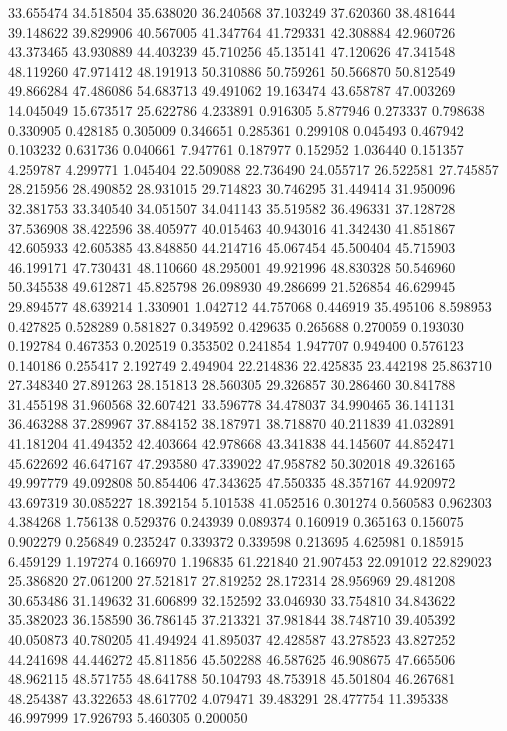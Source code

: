 33.655474
34.518504
35.638020
36.240568
37.103249
37.620360
38.481644
39.148622
39.829906
40.567005
41.347764
41.729331
42.308884
42.960726
43.373465
43.930889
44.403239
45.710256
45.135141
47.120626
47.341548
48.119260
47.971412
48.191913
50.310886
50.759261
50.566870
50.812549
49.866284
47.486086
54.683713
49.491062
19.163474
43.658787
47.003269
14.045049
15.673517
25.622786
4.233891
0.916305
5.877946
0.273337
0.798638
0.330905
0.428185
0.305009
0.346651
0.285361
0.299108
0.045493
0.467942
0.103232
0.631736
0.040661
7.947761
0.187977
0.152952
1.036440
0.151357
4.259787
4.299771
1.045404
22.509088
22.736490
24.055717
26.522581
27.745857
28.215956
28.490852
28.931015
29.714823
30.746295
31.449414
31.950096
32.381753
33.340540
34.051507
34.041143
35.519582
36.496331
37.128728
37.536908
38.422596
38.405977
40.015463
40.943016
41.342430
41.851867
42.605933
42.605385
43.848850
44.214716
45.067454
45.500404
45.715903
46.199171
47.730431
48.110660
48.295001
49.921996
48.830328
50.546960
50.345538
49.612871
45.825798
26.098930
49.286699
21.526854
46.629945
29.894577
48.639214
1.330901
1.042712
44.757068
0.446919
35.495106
8.598953
0.427825
0.528289
0.581827
0.349592
0.429635
0.265688
0.270059
0.193030
0.192784
0.467353
0.202519
0.353502
0.241854
1.947707
0.949400
0.576123
0.140186
0.255417
2.192749
2.494904
22.214836
22.425835
23.442198
25.863710
27.348340
27.891263
28.151813
28.560305
29.326857
30.286460
30.841788
31.455198
31.960568
32.607421
33.596778
34.478037
34.990465
36.141131
36.463288
37.289967
37.884152
38.187971
38.718870
40.211839
41.032891
41.181204
41.494352
42.403664
42.978668
43.341838
44.145607
44.852471
45.622692
46.647167
47.293580
47.339022
47.958782
50.302018
49.326165
49.997779
49.092808
50.854406
47.343625
47.550335
48.357167
44.920972
43.697319
30.085227
18.392154
5.101538
41.052516
0.301274
0.560583
0.962303
4.384268
1.756138
0.529376
0.243939
0.089374
0.160919
0.365163
0.156075
0.902279
0.256849
0.235247
0.339372
0.339598
0.213695
4.625981
0.185915
6.459129
1.197274
0.166970
1.196835
61.221840
21.907453
22.091012
22.829023
25.386820
27.061200
27.521817
27.819252
28.172314
28.956969
29.481208
30.653486
31.149632
31.606899
32.152592
33.046930
33.754810
34.843622
35.382023
36.158590
36.786145
37.213321
37.981844
38.748710
39.405392
40.050873
40.780205
41.494924
41.895037
42.428587
43.278523
43.827252
44.241698
44.446272
45.811856
45.502288
46.587625
46.908675
47.665506
48.962115
48.571755
48.641788
50.104793
48.753918
45.501804
46.267681
48.254387
43.322653
48.617702
4.079471
39.483291
28.477754
11.395338
46.997999
17.926793
5.460305
0.200050
